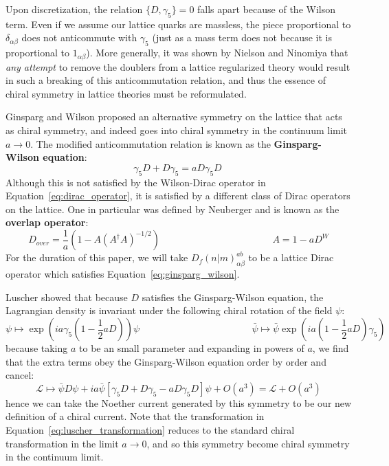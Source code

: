 \documentclass[11pt, oneside]{article}   	%
\theoremstyle{definition}
\begin{document}
Upon discretization, the relation $\{D, \gamma_5\} = 0$ falls apart because of the Wilson term. Even if we assume our lattice quarks are massless, 
the piece proportional to $\delta_{\alpha\beta}$ does not anticommute with $\gamma_5$ (just as a mass term does not because it is proportional 
to $1_{\alpha\beta}$). More generally, it was shown by Nielson and Ninomiya \cite{nogo} that \textit{any attempt} to remove the doublers from a 
lattice regularized theory would result in such a breaking of this anticommutation relation, and thus the essence of chiral symmetry in lattice 
theories must be reformulated. 

Ginsparg and Wilson \cite{ginsparg} proposed an alternative symmetry on the lattice that acts as chiral symmetry, and indeed goes into chiral symmetry in the continuum 
limit $a\rightarrow 0$. The modified anticommutation relation is known as the \textbf{Ginsparg-Wilson equation}:
\begin{equation}
	\gamma_5 D + D\gamma_5 = aD\gamma_5 D~
	\label{eq:ginsparg_wilson}
\end{equation}
Although this is not satisfied by the Wilson-Dirac operator in Equation~\ref{eq:dirac_operator}, it is satisfied by a different class of Dirac operators on the lattice. One in 
particular was defined by Neuberger \cite{neuberger} and is known as the \textbf{overlap operator}:
\begin{equation}
	D_{over} = \frac{1}{a}\left(1 - A (A^\dagger A)^{-1/2}\right)\;\;\;\;\;\;\;\;\;\;\;\;\;\;\;\;\;\;\;\;\;\;\;\;\;\;\;\;\;\;\;\;\;\;\;\;\;\;\;\;\;\;  A = 1 - aD^W
\end{equation}
For the duration of this paper, we will take $D_f(n | m)_{\alpha\beta}^{ab}$ to be a lattice Dirac operator which satisfies Equation~\ref{eq:ginsparg_wilson}.

Luscher \cite{luscher} showed that because $D$ satisfies the Ginsparg-Wilson equation, the Lagrangian density is invariant under the following chiral rotation of the 
field $\psi$:
\begin{equation}
	\psi\mapsto \exp\left(ia\gamma_5 \left(1 - \frac{1}{2}a D\right)\right)\psi\;\;\;\;\;\;\;\;\;\;\;\;\;\;\;\;\;\;\;\;\;\;\;\;\;\;\;\;\;\;\;\;\;\;\;\;\;\;\;\;\;\; \bar\psi\mapsto\bar\psi 
	\exp\left(ia\left(1 - \frac{1}{2}aD\right)\gamma_5\right)~
	\label{eq:luscher_transformation}
\end{equation}
because taking $a$ to be an small parameter and expanding in powers of $a$, we find that the extra terms obey the Ginsparg-Wilson equation order by 
order and cancel:
\begin{equation}
	\mathcal L \mapsto \bar\psi D\psi + ia\bar\psi\left[\gamma_5 D + D\gamma_5 - a D\gamma_5 D\right]\psi + O(a^3) = \mathcal L + O(a^3)
\end{equation}
hence we can take the Noether current generated by this symmetry to be our new definition of a chiral current. Note that the transformation in 
Equation~\ref{eq:luscher_transformation} reduces to the standard chiral transformation in the limit $a\rightarrow 0$, and so this symmetry become 
chiral symmetry in the continuum limit. 
\end{document}
